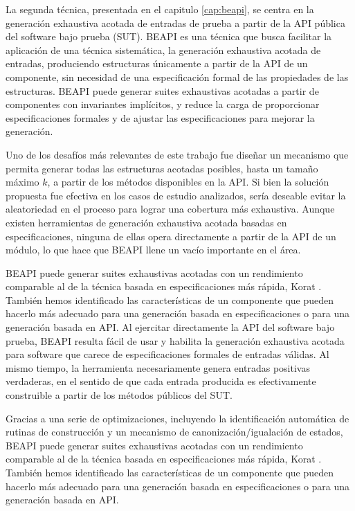 La segunda técnica, presentada en el capitulo \ref{cap:beapi}, se centra en la generación exhaustiva acotada de entradas de prueba a partir de la API pública del software bajo prueba (SUT).
BEAPI es una técnica que busca facilitar la aplicación de una técnica sistemática, la generación exhaustiva acotada de entradas, produciendo estructuras únicamente a partir de la API de un componente, 
sin necesidad de una especificación formal de las propiedades de las estructuras. BEAPI puede generar suites exhaustivas acotadas 
a partir de componentes con invariantes implícitos, y reduce la carga de proporcionar especificaciones formales y de ajustar 
las especificaciones para mejorar la generación. 

Uno de los desafíos más relevantes de este trabajo fue diseñar un mecanismo que permita generar todas las estructuras acotadas posibles, 
hasta un tamaño máximo \( k \), a partir de los métodos disponibles en la API. Si bien la solución propuesta fue efectiva en los casos de estudio analizados, sería deseable evitar la aleatoriedad en el proceso para lograr una cobertura más exhaustiva. 
Aunque existen herramientas de generación exhaustiva acotada basadas en especificaciones, ninguna de ellas opera directamente a partir de la API de un módulo, lo que hace que BEAPI llene un vacío importante en el área.

BEAPI puede generar suites exhaustivas acotadas con 
un rendimiento comparable al de la técnica basada en especificaciones más rápida, Korat \cite{Boyapati02}. También hemos identificado las
características de un componente que pueden hacerlo más adecuado para una generación basada en especificaciones o para una generación basada en API.
Al ejercitar directamente la API del software bajo prueba, BEAPI resulta fácil de usar y habilita la generación exhaustiva acotada para software que carece de especificaciones formales de entradas válidas. 
Al mismo tiempo, la herramienta necesariamente genera entradas positivas verdaderas, en el sentido de que cada entrada producida es efectivamente construible a partir de los métodos públicos del SUT.

Gracias a una serie de optimizaciones, incluyendo la identificación automática de 
rutinas de construcción y un mecanismo de canonización/igualación de estados, BEAPI puede generar suites exhaustivas acotadas con 
un rendimiento comparable al de la técnica basada en especificaciones más rápida, Korat \cite{Boyapati02}. También hemos identificado las
características de un componente que pueden hacerlo más adecuado para una generación basada en especificaciones o para una generación basada en API.

